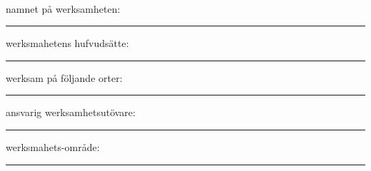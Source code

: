 \documentclass{letter}
\begin{document}
\phantom{registringen rör:}\\

\vspace*{0.45cm}

namnet på werksamheten:
\vspace*{1cm}
\hrule
werksmahetens hufvudsätte:
\vspace*{1cm}
\hrule
werksam på följande orter:
\vspace*{1cm}
\hrule
ansvarig werksamhetsutövare:
\vspace*{1cm}
\hrule
werksmahets-område:
\vspace*{1cm}
\hrule
\end{document}
